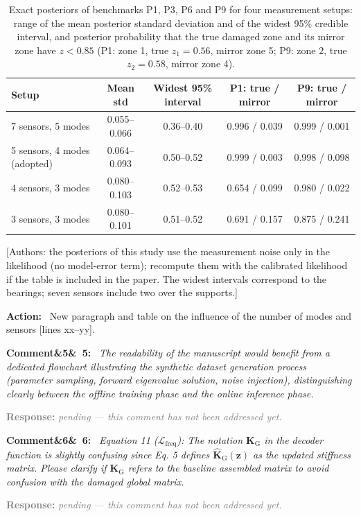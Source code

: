 \documentclass[11pt]{article}
\newenvironment{rcomment}[1]{\par\bigskip\noindent\textbf{Comment\ifx&#1&\else\ #1\fi:}\ \itshape}{\par}
\newenvironment{action}{\par\smallskip\noindent\color{resp}\textbf{Action:}\ }{\par}
\newcommand{\pending}{\par\smallskip\noindent\textcolor{gray}{\textbf{Response:} \textit{pending --- this comment
has not been addressed yet.}}\par}
\newcommand{\authornote}[1]{\textcolor{note}{\textsf{[Authors: #1]}}}
\newcommand{\tbd}[1]{\textcolor{note}{\textsf{[#1]}}}
\newcommand{\lines}[1]{\tbd{lines #1}}
\newcommand{\z}{\mathbf{z}}
\begin{document}
\begin{table}[H]
\centering\small
\caption{Exact posteriors of benchmarks P1, P3, P6 and P9 for four measurement setups: range of the mean posterior
standard deviation and of the widest 95\% credible interval, and posterior probability that the true damaged zone and
its mirror zone have $z<0.85$ (P1: zone 1, true $z_1=0.56$, mirror zone 5; P9: zone 2, true $z_2=0.58$, mirror zone
4).}
\label{tab:modes}
\footnotesize\setlength{\tabcolsep}{5pt}
\begin{tabular}{lcccc}
\toprule
Setup & Mean std & Widest 95\% interval & P1: true / mirror & P9: true / mirror \\
\midrule
7 sensors, 5 modes & 0.055--0.066 & 0.36--0.40 & 0.996 / 0.039 & 0.999 / 0.001 \\
5 sensors, 4 modes (adopted) & 0.064--0.093 & 0.50--0.52 & 0.999 / 0.003 & 0.998 / 0.098 \\
4 sensors, 3 modes & 0.080--0.103 & 0.52--0.53 & 0.654 / 0.099 & 0.980 / 0.022 \\
3 sensors, 3 modes & 0.080--0.101 & 0.51--0.52 & 0.691 / 0.157 & 0.875 / 0.241 \\
\bottomrule
\end{tabular}
\end{table}
\authornote{the posteriors of this study use the measurement noise only in the likelihood (no model-error term);
recompute them with the calibrated likelihood if the table is included in the paper. The widest intervals correspond
to the bearings; seven sensors include two over the supports.}

\begin{action}
New paragraph and table on the influence of the number of modes and sensors \lines{xx--yy}.
\end{action}

\begin{rcomment}{5}
The readability of the manuscript would benefit from a dedicated flowchart illustrating the synthetic dataset
generation process (parameter sampling, forward eigenvalue solution, noise injection), distinguishing clearly between
the offline training phase and the online inference phase.
\end{rcomment}
\pending

\begin{rcomment}{6}
Equation 11 ($\mathcal{L}_{\mathrm{freq}}$): The notation $\mathbf{K}_{\mathrm{G}}$ in the decoder function is slightly
confusing since Eq. 5 defines $\hat{\mathbf{K}}_{\mathrm{G}}(\z)$ as the updated stiffness matrix. Please clarify if
$\mathbf{K}_{\mathrm{G}}$ refers to the baseline assembled matrix to avoid confusion with the damaged global matrix.
\end{rcomment}
\pending
\end{document}
